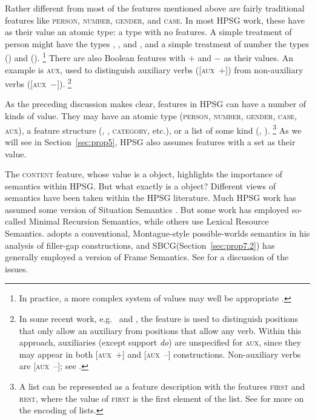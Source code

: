 \documentclass[output=paper,biblatex,babelshorthands,newtxmath,draftmode,colorlinks,citecolor=brown]{langscibook}
\begin{document}
Rather different from most of the features mentioned above are fairly traditional features like
\textsc{person, number, gender}, and \textsc{case}. In most HPSG work, these have as their value an
atomic type: a type with no features. A simple treatment of person might have the
types , , and , and a simple treatment of number the types
 () and  ().%
%
\footnote{In practice, a more complex system of values may well be appropriate \citep[Section~3]{Flickinger2000a}.}
%
There are also Boolean features with $+$ and $-$ as their values. An example is \textsc{aux}, used
to distinguish auxiliary verbs ([\textsc{aux}~$+$]) from non-auxiliary verbs ([\textsc{aux}~$-$]).%
%
\footnote{In some recent work, e.g.\ \citet[157--162]{Sag2012a} and \citet{Sag2020a}, the feature is
  used to distinguish positions that only allow an auxiliary from positions that allow any
  verb. Within this approach, auxiliaries (except support \emph{do}) are unspecified for
  \textsc{aux}, since they may appear in both [\textsc{aux}~$+$] and [\textsc{aux}~$–$]
  constructions. Non-auxiliary verbs are [\textsc{aux}~$–$]; see
  .} 
%

As the preceding discussion makes clear, features in HPSG can have a number of kinds of value. They
may have an atomic type (\textsc{person}, \textsc{number}, \textsc{gender}, \textsc{case},
\textsc{aux}), a feature structure (\synsem, \local, \textsc{category}, etc.), or a list of some
kind (\subj, \comps).%
%
\footnote{A list can be represented as a feature description with the features \textsc{first} and
  \textsc{rest}, where the value of \textsc{first} is the first element of the list. See
  \crossrefchapterw[\page \pageref{page-list-encoding}]{formal-background} for more on the encoding
  of lists.} 
%
As we will see in Section~\ref{sec:prop5}, HPSG also assumes features with a set as their value.

\largerpage
{\sloppypar
The \textsc{content} feature, whose value is a  object, highlights the importance of
semantics within HPSG. But what exactly is a  object? Different views of semantics
have been taken within the HPSG literature. Much HPSG work has assumed some version of Situation
Semantics \citep{BP83a}. But some work has employed so-called Minimal
Recursion Semantics\indexmrs \citep*{CFPS2005a}, while others use Lexical Resource
Semantics\indexlrs \citep{RS2004a-u}. \citet[501]{Sag2010b} adopts a
conventional, Montague-style possible-worlds semantics \citep{Montague74a-ed} in his analysis of
 filler-gap constructions, and SBCG\indexsbcg (Section~\ref{sec:prop7.2}) has generally employed a
version of Frame Semantics. See  for a discussion of the issues.
}
\end{document}
